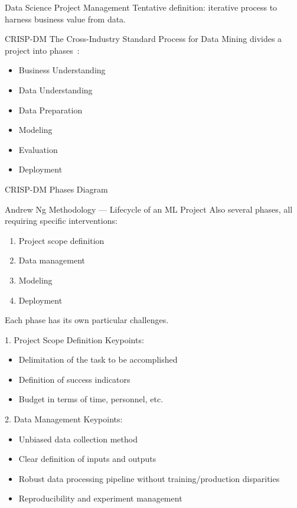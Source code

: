 \begin{frame}{Data Science Project Management}
  Tentative definition: iterative process to harness business value from data.
\end{frame}

\begin{frame}{CRISP-DM}
  The Cross-Industry Standard Process for Data Mining divides a project into phases~:

  \begin{itemize}
    \item Business Understanding
    \item Data Understanding
    \item Data Preparation
    \item Modeling
    \item Evaluation
    \item Deployment
  \end{itemize}
\end{frame}

\begin{frame}{CRISP-DM Phases Diagram}
\end{frame}

\begin{frame}{Andrew Ng Methodology — Lifecycle of an ML Project}
  Also several phases, all requiring specific interventions:
  \begin{enumerate}
    \item Project scope definition
    \item Data management
    \item Modeling
    \item Deployment
  \end{enumerate}
  Each phase has its own particular challenges.
\end{frame}

\begin{frame}{1. Project Scope Definition}
  Keypoints:
  \begin{itemize}
    \item Delimitation of the task to be accomplished
    \item Definition of success indicators
    \item Budget in terms of time, personnel, etc.
  \end{itemize}
\end{frame}

\begin{frame}{2. Data Management}
  Keypoints:
  \begin{itemize}
    \item Unbiased data collection method
    \item Clear definition of inputs and outputs
    \item Robust data processing pipeline without training/production disparities
    \item Reproducibility and experiment management
  \end{itemize}
\end{frame}

